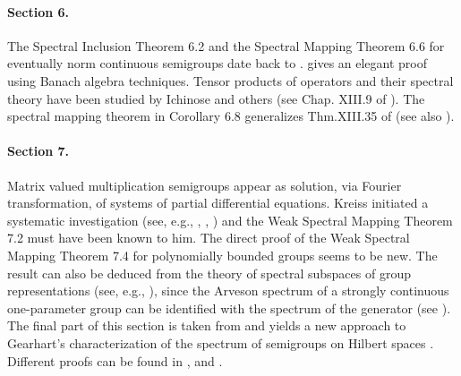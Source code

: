 \paragraph{Section 6.} The Spectral Inclusion Theorem 6.2 and the Spectral Mapping Theorem 6.6 for eventually norm continuous semigroups date back to \citet{hillephillips:1957}.
\citet{davies:1980} gives an elegant proof using Banach algebra techniques.
Tensor products of operators and their spectral theory have been studied by Ichinose and others (see Chap. XIII.9 of \citet{reedsimon:1978}).
The spectral mapping theorem in Corollary 6.8 generalizes Thm.XIII.35 of \citet{reedsimon:1978} (see also \citet{herbst:1982}).

\paragraph{Section 7.} Matrix valued multiplication semigroups appear as solution, via Fourier transformation, of systems of partial differential equations.
Kreiss initiated a systematic investigation (see, e.g., \citet{kreiss:1958}, \citet{kreiss:1959}, \citet{millerstrang:1966}) and the Weak Spectral Mapping Theorem 7.2 must have been known to him. The direct proof of the Weak Spectral Mapping Theorem 7.4 for polynomially bounded groups seems to be new. The result can also be deduced from the theory of spectral subspaces of group representations (see, e.g., \citet{combesdelaroche:1978}), since the Arveson spectrum of a strongly continuous one-parameter group can be identified with the spectrum of the generator (see \citet{evans:1976}). The final part of this section is taken from \citet{greiner:1985} and yields a new approach to Gearhart's characterization of the spectrum of semigroups on Hilbert spaces \citet{gearhart:1978}. Different proofs can be found in \citet{herbst:1983}, \citet{howland:1984} and \citet{prüß:1984}.



